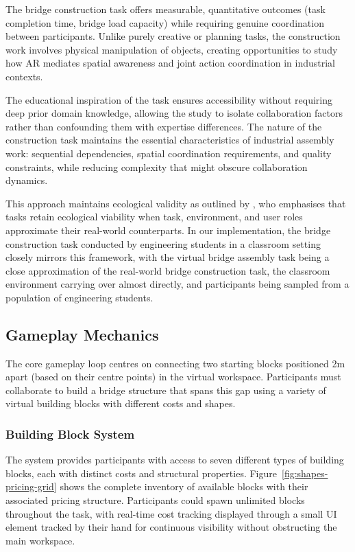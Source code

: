 The bridge construction task offers measurable, quantitative outcomes (task completion time, bridge load capacity) while requiring genuine coordination between participants. Unlike purely creative or planning tasks, the construction work involves physical manipulation of objects, creating opportunities to study how AR mediates spatial awareness and joint action coordination in industrial contexts.

The educational inspiration of the task ensures accessibility without requiring deep prior domain knowledge, allowing the study to isolate collaboration factors rather than confounding them with expertise differences. The nature of the construction task maintains the essential characteristics of industrial assembly work: sequential dependencies, spatial coordination requirements, and quality constraints, while reducing complexity that might obscure collaboration dynamics.

This approach maintains ecological validity as outlined by \cite{personeni2023ecological}, who emphasises that tasks retain ecological viability when task, environment, and user roles approximate their real-world counterparts. In our implementation, the bridge construction task conducted by engineering students in a classroom setting closely mirrors this framework, with the virtual bridge assembly task being a close approximation of the real-world bridge construction task, the classroom environment carrying over almost directly, and participants being sampled from a population of engineering students.

\subsection{Gameplay Mechanics}\label{subsec:gameplay-mechanics}
The core gameplay loop centres on connecting two starting blocks positioned 2m apart (based on their centre points) in the virtual workspace. Participants must collaborate to build a bridge structure that spans this gap using a variety of virtual building blocks with different costs and shapes.

\subsubsection{Building Block System}
The system provides participants with access to seven different types of building blocks, each with distinct costs and structural properties. Figure~\ref{fig:shapes-pricing-grid} shows the complete inventory of available blocks with their associated pricing structure. Participants could spawn unlimited blocks throughout the task, with real-time cost tracking displayed through a small UI element tracked by their hand for continuous visibility without obstructing the main workspace.

